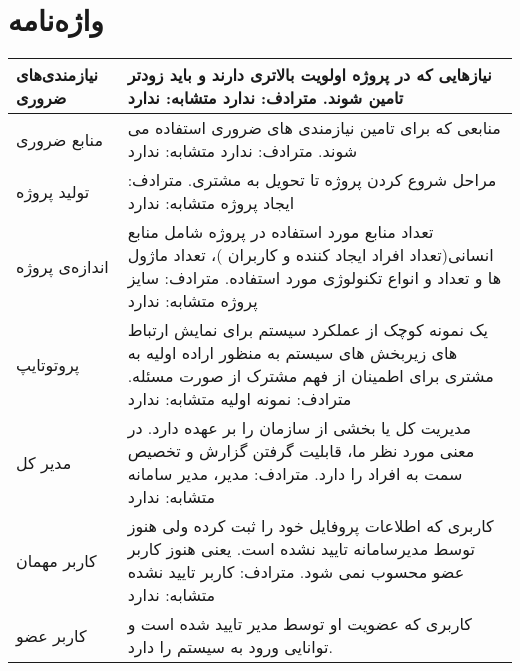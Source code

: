 \newpage
\section{واژه‌نامه}

\begin{tabular}{|p{2cm}|p{10cm}|}

\hline
نیازمندی‌های ضروری
&
نیازهایی که در پروژه اولویت بالاتری دارند و باید زودتر تامین شوند.
\newline
			 مترادف: ندارد
			 \newline
				متشابه: ندارد
\\
\hline
منابع ضروری
&
منابعی که برای تامین نیازمندی های ضروری استفاده می شوند.
\newline
				مترادف: ندارد
				\newline
				متشابه: ندارد
\\
\hline
تولید پروژه 
&
	مراحل شروع کردن پروژه تا تحویل به مشتری.
\newline
				مترادف: ایجاد پروژه
				\newline
				متشابه: ندارد
\\
\hline
اندازه‌ی پروژه 
&
تعداد منابع مورد استفاده در پروژه شامل منابع انسانی(تعداد افراد ایجاد کننده و
کاربران )، تعداد ماژول ها و تعداد و انواع تکنولوژی مورد استفاده.
\newline
				مترادف: سایز پروژه
				\newline
				متشابه: ندارد
\\
\hline
پروتوتایپ	
&
یک نمونه کوچک از عملکرد سیستم برای نمایش ارتباط های زیربخش های سیستم به 
منظور اراده اولیه به مشتری برای اطمینان از فهم مشترک از صورت مسئله.
\newline
				مترادف: نمونه اولیه
				\newline
				متشابه: ندارد
\\
\hline
مدیر کل
&
        مدیریت کل یا بخشی از سازمان را بر عهده دارد. در معنی مورد نظر ما، قابلیت گرفتن 
گزارش و تخصیص سمت به افراد را دارد.
\newline
				مترادف: مدیر، مدیر سامانه
				\newline
				متشابه: ندارد
\\
\hline
کاربر مهمان
&
 کاربری که اطلاعات پروفایل خود را ثبت کرده ولی هنوز توسط مدیرسامانه تایید نشده
				است. یعنی هنوز کاربر عضو محسوب نمی شود.
				\newline
				مترادف: کاربر تایید نشده
				\newline
				متشابه: ندارد
\\
\hline
کاربر عضو
&
کاربری که عضویت او توسط مدیر تایید شده است و توانایی ورود به سیستم را دارد.

\end{tabular}
